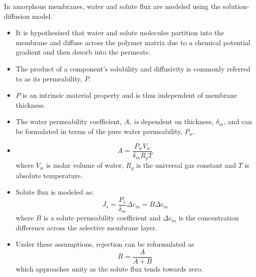   In amorphous membranes, water and solute flux are modeled using the solution-diffusion 
  model.
  \begin{itemize}
    \item It is hypothesized that water and solute molecules partition into the
    membrane and diffuse across the polymer matrix due to a chemical potential
    gradient and then desorb into the permeate.
    \item The product of a component's solubility and diffusivity is commonly
    referred to as its permeability, $P$.~\cite{wijmans_solution-diffusion_1995}
    \item $P$ is an intrinsic material property and is thus independent of membrane
    thickness.  %
    \item The water permeability coefficient, $A$, \textit{is} dependent on thickness, $\delta_m$,
    and can be formulated in terms of the pure water permeability, $P_w$.
    \item \begin{equation}
    A = \frac{P_wV_w}{\delta_mR_gT}
    \end{equation}
    where $V_w$ is molar volume of water, $R_g$ is the universal gas constant and $T$ is
    absolute temperature.
    \item Solute flux is modeled as:
    \begin{equation}
    J_s = \frac{P_s}{\delta_m}\Delta c_m = B\Delta c_m
    \end{equation}
    where $B$ is a solute permeability coefficient and $\Delta c_m$ is the concentration
    difference across the selective membrane layer.~\cite{geise_fundamental_2014}
    \item Under these assumptions, rejection can be reformulated as
    \begin{equation}
    R = \frac{A}{A + B}
    \end{equation}
    which approaches unity as the solute flux tends towards zero.~\cite{van_der_bruggen_review_2003}
  \end{itemize}  
  

